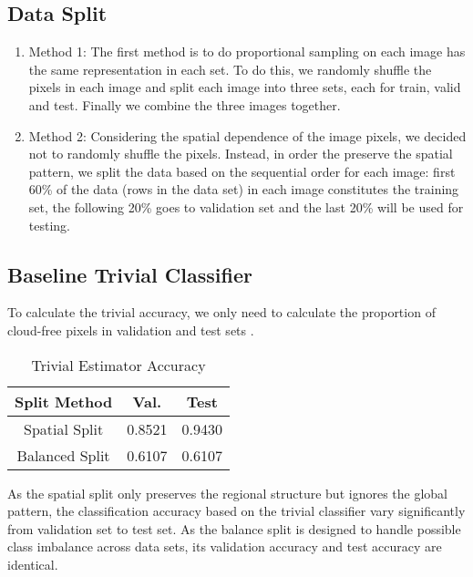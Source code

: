 \documentclass[letterpaper,11pt]{article}
\begin{document}
\subsection{Data Split}
\begin{enumerate}
\item Method 1: The first method is to do proportional sampling on each image has the same representation in each set. To do this, we randomly shuffle the pixels in each image and split each image into three sets, each for train, valid and test.  Finally we combine the three images together.
\item Method 2: Considering the spatial dependence of the image pixels, we decided not to randomly shuffle the pixels. Instead, in order the preserve the spatial pattern, we split the data based on the sequential order for each image: first 60\% of the data (rows in the data set) in each image constitutes the training set, the following 20\% goes to validation set and the last 20\% will be used for testing.
\end{enumerate}


\subsection{Baseline Trivial Classifier}
To calculate the trivial accuracy, we only need to calculate the proportion of cloud-free pixels in validation and test sets .

\begin{table}[!hbt]
    \centering
    \begin{tabular}{|c|c|c|}\hline
        Split Method & Val. & Test \\ \hline
         Spatial Split  & 0.8521 & 0.9430 \\ \hline
         Balanced Split & 0.6107 & 0.6107 \\ \hline
    \end{tabular}
    \caption{Trivial Estimator Accuracy}
    \label{tab:tea}
\end{table}

As the spatial split only preserves the regional structure but ignores the global pattern, the classification accuracy based on the trivial classifier vary significantly from validation set to test set. As the balance split is designed to handle possible class imbalance across data sets, its validation accuracy and test accuracy are identical. 
\end{document}
